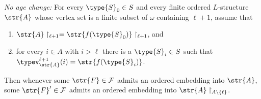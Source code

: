 \item\label{item:boringage} \emph{No age change:}
		For every $\type{S}_0\in S$ and every finite ordered $L$-structure
		$\str{A}$ whose vertex set is a finite subset of $\omega$ containing
		$\ell+1$, assume that
		\begin{enumerate}
			\item $\str{A}\restriction_{\ell+1}=
				\str{f(\type{S}_0)}\restriction_{\ell+1}$, and
			\item for every $i\in A$ with $i>\ell$ there is a
				$\type{S}_i\in S$ such that
				$\typev^{\ell+1}_{\str{A}}(i)=\str{f(\type{S}_i)}$.
		\end{enumerate}
		Then whenever some $\str{F}\in\mathcal F$ admits an ordered embedding
		into $\str{A}$, some $\str{F}'\in\mathcal F$ admits an ordered
		embedding into $\str{A}\restriction_{A\setminus\{\ell\}}$.
